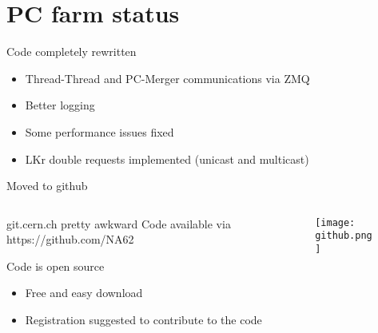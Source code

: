 \section*{PC farm status}

\begin{frame}{Code completely rewritten}{}
	\begin{itemize}
  		\item Thread-Thread and PC-Merger communications via ZMQ
  		\item Better logging
  		\item Some performance issues fixed
  		\item LKr double requests implemented (unicast and multicast)
  		 
	\end{itemize}
\end{frame}

\begin{frame}{Moved to github}{}
	\begin{columns}[t]
		\begin{column}{6cm}
		
				\begin{block}{git.cern.ch pretty awkward}
					Code available via https://github.com/NA62
				\end{block}
				
					\begin{block}{Code is open source}
						\begin{itemize}
				  			\item Free and easy download
				  			\item Registration suggested to contribute to the code 
						\end{itemize}
					\end{block}
	
		\end{column}
		\begin{column}{4cm}
			\vspace{-1cm}
			\begin{figure}[htp]
				  \texttt{[image: github.png]}
			\end{figure}
		\end{column}
	\end{columns}

\end{frame}

